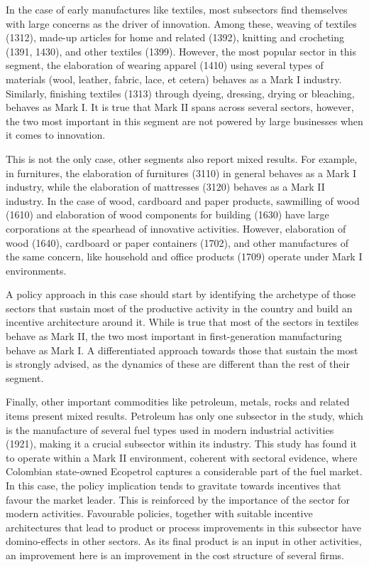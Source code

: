 \documentclass[12pt,a4paper]{article}
\begin{document}
In the case of early manufactures like textiles, most subsectors find themselves with large concerns as the driver of innovation. Among these, weaving of textiles (1312), made-up articles for home and related (1392), knitting and crocheting (1391, 1430), and other textiles (1399). However, the most popular sector in this segment, the elaboration of wearing apparel (1410) using several types of materials (wool, leather, fabric, lace, et cetera) behaves as a Mark I industry. Similarly, finishing textiles (1313) through dyeing, dressing, drying or bleaching, behaves as Mark I. It is true that Mark II spans across several sectors, however, the two most important in this segment are not powered by large businesses when it comes to innovation.  

This is not the only case, other segments also report mixed results. For example, in furnitures, the elaboration of furnitures (3110) in general behaves as a Mark I industry, while the elaboration of mattresses (3120) behaves as a Mark II industry. In the case of wood, cardboard and paper products, sawmilling of wood (1610) and elaboration of wood components for building (1630) have large corporations at the spearhead of innovative activities. However, elaboration of wood (1640), cardboard or paper containers (1702), and other manufactures of the same concern, like household and office products (1709) operate under Mark I environments. 

A policy approach in this case should start by identifying the archetype of those sectors that sustain most of the productive activity in the country and build an incentive architecture around it. While  is true that most of the sectors in textiles behave as Mark II, the two most important in first-generation manufacturing behave as Mark I. A differentiated approach towards those that sustain the most is strongly advised, as the dynamics of these are different than the rest of their segment. 

Finally, other important commodities like petroleum, metals, rocks and related items present mixed results. Petroleum has only one subsector in the study, which is the manufacture of several fuel types used in modern industrial activities (1921), making it a crucial subsector within its industry. This study has found it to operate within a Mark II environment, coherent with sectoral evidence, where Colombian state-owned Ecopetrol captures a considerable part of the fuel market. In this case, the policy implication tends to gravitate towards incentives that favour the market leader. This is reinforced by the importance of the sector for modern activities. Favourable policies, together with suitable incentive architectures that lead to product or process improvements in this subsector have domino-effects in other sectors. As its final product is an input in other activities, an improvement here is an improvement in the cost structure of several firms. 
\end{document}
